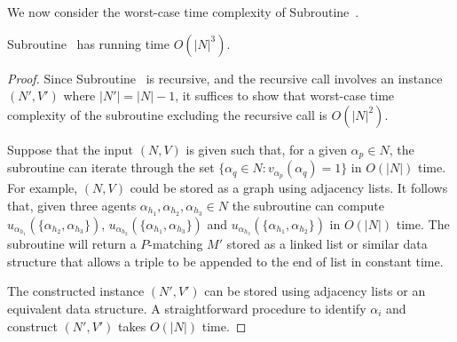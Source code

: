 We now consider the worst-case time complexity of Subroutine~.

\begin{lem}
\label{lem:threed_sr_as_symmetric_binary_algfindstablepmatchingrunningtime}
Subroutine~ has running time $O(|N|^3)$.
\end{lem}
\begin{proof}

Since Subroutine~ is recursive, and the recursive call involves an instance $(N', V')$ where $|N'| = |N| - 1$, it suffices to show that worst-case time complexity of the subroutine excluding the recursive call is $O(|N|^2)$.

Suppose that the input $(N, V)$ is given such that, for a given $\alpha_{p}\in N$, the subroutine can iterate through the set $\{ \alpha_{q} \in N : v_{\alpha_{p}}(\alpha_{q})=1 \}$ in $O(|N|)$ time. For example, $(N, V)$ could be stored as a graph using adjacency lists. It follows that, given three agents $\alpha_{h_1}, \alpha_{h_2}, \alpha_{h_3}\in N$ the subroutine can compute $u_{\alpha_{h_1}}(\{ \alpha_{h_2}, \alpha_{h_3} \})$, $u_{\alpha_{h_2}}(\{ \alpha_{h_1}, \alpha_{h_3} \})$ and $u_{\alpha_{h_3}}(\{ \alpha_{h_1}, \alpha_{h_2} \})$ in $O(|N|)$ time. The subroutine will return a $P$\nobreakdash-matching $M'$ stored as a linked list or similar data structure that allows a triple to be appended to the end of list in constant time.


The constructed instance $(N',V')$ can be stored using adjacency lists or an equivalent data structure. A straightforward procedure to identify $\alpha_i$ and construct $(N', V')$ takes $O(|N|)$ time.


\end{proof}
